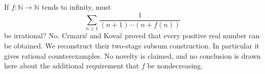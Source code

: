 If $f:\mathbb N\to\mathbb N$ tends to infinity, must
\[
 \sum_{n\ge1}\frac1{(n+1)\cdots(n+f(n))}
\]
be irrational? No. Crmari\'c and Kova\v c proved that every positive real number can be obtained. We reconstruct their two-stage subsum construction. In particular it gives rational counterexamples. No novelty is claimed, and no conclusion is drawn here about the additional requirement that $f$ be nondecreasing.

